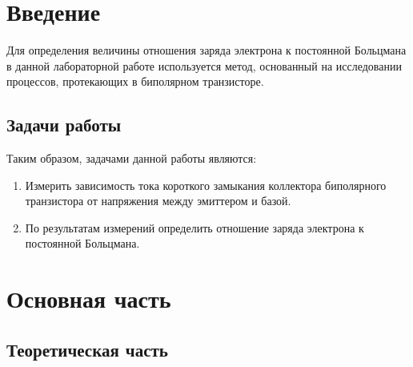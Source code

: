 

\section{Введение}
Для определения величины отношения заряда электрона к постоянной
Больцмана в данной лабораторной работе используется метод, основанный на исследовании
процессов, протекающих в биполярном транзисторе.



\subsection{Задачи работы}

Таким образом, задачами данной работы являются:
\begin{enumerate}
    \item Измерить зависимость тока короткого замыкания коллектора биполярного
транзистора от напряжения между эмиттером и базой.
    \item По результатам измерений определить отношение заряда электрона к
постоянной Больцмана.
\end{enumerate}




\section{Основная часть}

\subsection{Теоретическая часть}
